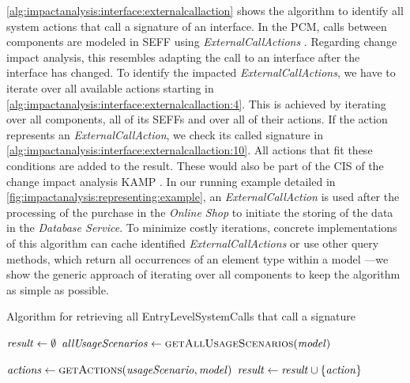 \autoref{alg:impactanalysis:interface:externalcallaction} shows the algorithm to identify all system actions that call a signature of an interface.
In the \ac{PCM}, calls between components are modeled in \ac{SEFF} using \emph{ExternalCallActions} \cite{becker_palladio_2009}.
Regarding change impact analysis, this resembles adapting the call to an interface after the interface has changed.
To identify the impacted \emph{ExternalCallActions}, we have to iterate over all available actions starting in \autoref{alg:impactanalysis:interface:externalcallaction:4}.
This is achieved by iterating over all components, all of its \acp{SEFF} and over all of their actions.
If the action represents an \emph{ExternalCallAction}, we check its called signature in \autoref{alg:impactanalysis:interface:externalcallaction:10}.
All actions that fit these conditions are added to the result.
These would also be part of the \ac{CIS} of the change impact analysis \ac{KAMP} \cite{busch_architecture-based_2020}.
In our running example detailed in \autoref{fig:impactanalysis:representing:example}, an \emph{ExternalCallAction} is used after the processing of the purchase in the \emph{Online Shop} to initiate the storing of the data in the \emph{Database Service}.
To minimize costly iterations, concrete implementations of this algorithm can cache identified \emph{ExternalCallActions} or use other query methods, which return all occurrences of an element type within a model \cite{dataset}---we show the generic approach of iterating over all components to keep the algorithm as simple as possible.


\begin{algorithm}
    \caption{Algorithm for retrieving all EntryLevelSystemCalls that call a signature}
    \label{alg:impactanalysis:interface:entrylevelsystemcall}
    \begin{algorithmic}[1]
        \algindentskip
        \State $\mathit{result} \gets \emptyset$
        \State $\mathit{allUsageScenarios} \gets \textsc{getAllUsageScenarios}(\mathit{model})$
        \algblockskip

         \label{alg:impactanalysis:interface:entrylevelsystemcall:4}
            \State $\mathit{actions} \gets \textsc{getActions}(\mathit{usageScenario}, \mathit{model})$
             
                 \label{alg:impactanalysis:interface:entrylevelsystemcall:7}
                     \label{alg:impactanalysis:interface:entrylevelsystemcall:8}
                        \State $\mathit{result} \gets \mathit{result} \cup \{ \mathit{action} \}$
                    \EndIf
                \EndIf
            \EndFor
        \EndFor
        \algblockskip

        \State {}
        \algindentskip
        \EndProcedure   
    \end{algorithmic}
\end{algorithm}

